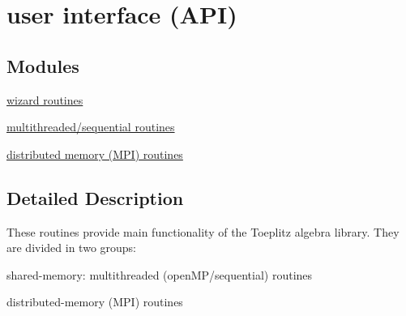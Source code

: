 \hypertarget{group__group1}{\section{user interface (A\-P\-I)}
\label{group__group1}
}
\subsection*{Modules}
\begin{DoxyCompactItemize}
\item 
\hyperlink{group__wizard}{wizard routines}
\item 
\hyperlink{group__group11}{multithreaded/sequential routines}
\item 
\hyperlink{group__group12}{distributed memory (\-M\-P\-I) routines}
\end{DoxyCompactItemize}


\subsection{Detailed Description}
These routines provide main functionality of the Toeplitz algebra library. They are divided in two groups\-:
\begin{DoxyItemize}
\item shared-\/memory\-: multithreaded (open\-M\-P/sequential) routines
\item distributed-\/memory (M\-P\-I) routines 
\end{DoxyItemize}